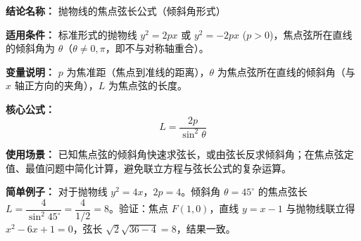 \textbf{结论名称：} 抛物线的焦点弦长公式（倾斜角形式）

\textbf{适用条件：} 标准形式的抛物线 \(y^2=2px\) 或 \(y^2=-2px\) (\(p>0\))，焦点弦所在直线的倾斜角为 \(\theta\)（\(\theta\neq 0,\pi\)，即不与对称轴重合）。

\textbf{变量说明：} \(p\) 为焦准距（焦点到准线的距离），\(\theta\) 为焦点弦所在直线的倾斜角（与 \(x\) 轴正方向的夹角），\(L\) 为焦点弦的长度。

\textbf{核心公式：}
\[
\boxed{ L = \frac{2p}{\sin^2\theta} }
\]

\textbf{使用场景：} 已知焦点弦的倾斜角快速求弦长，或由弦长反求倾斜角；在焦点弦定值、最值问题中简化计算，避免联立方程与弦长公式的复杂运算。

\textbf{简单例子：} 对于抛物线 \(y^2=4x\)，\(2p=4\)。倾斜角 \(\theta=45^\circ\) 的焦点弦长 \(L = \dfrac{4}{\sin^2 45^\circ} = \dfrac{4}{1/2}=8\)。验证：焦点 \(F(1,0)\)，直线 \(y=x-1\) 与抛物线联立得 \(x^2-6x+1=0\)，弦长 \(\sqrt{2}\sqrt{36-4}=8\)，结果一致。
